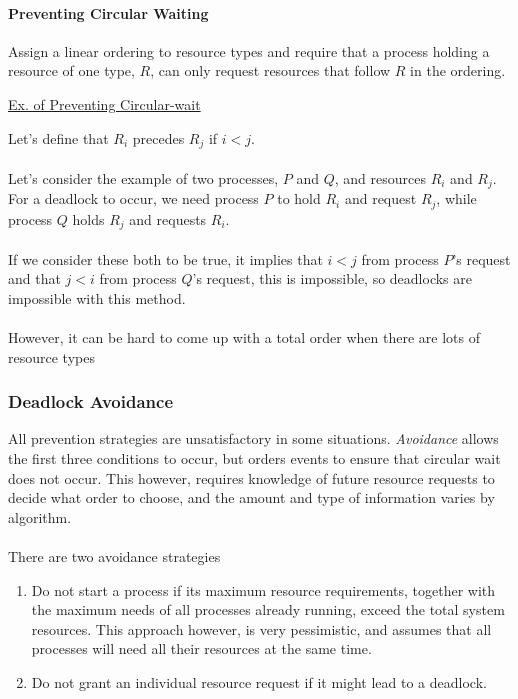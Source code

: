 \documentclass{article}
\begin{document}
\paragraph{Preventing Circular Waiting} Assign a linear ordering to resource types and require that a process holding a resource of one type, $R$, can only request resources that follow $R$ in the ordering.

\underline{Ex. of Preventing Circular-wait}

Let's define that $R_i$ precedes $R_j$ if $i < j$.
\\
\\
Let's consider the example of two processes, $P$ and $Q$, and resources $R_i$ and $R_j$. For a deadlock to occur, we need process $P$ to hold $R_i$ and request $R_j$, while process $Q$ holds $R_j$ and requests $R_i$.
\\
\\
If we consider these both to be true, it implies that $i<j$ from process $P$'s request and that $j<i$ from process $Q$'s request, this is impossible, so deadlocks are impossible with this method.
\\
\\
However, it can be hard to come up with a total order when there are lots of resource types

\subsubsection{Deadlock Avoidance}

All prevention strategies are unsatisfactory in some situations. \textit{Avoidance} allows the first three conditions to occur, but orders events to ensure that circular wait does not occur. This however, requires knowledge of future resource requests to decide what order to choose, and the amount and type of information varies by algorithm.
\\
\\
There are two avoidance strategies

\begin{enumerate}
  \item Do not start a process if its maximum resource requirements, together with the maximum needs of all processes already running, exceed the total system resources. This approach however, is very pessimistic, and assumes that all processes will need all their resources at the same time.

  \item Do not grant an individual resource request if it might lead to a deadlock.
\end{enumerate}
\end{document}
